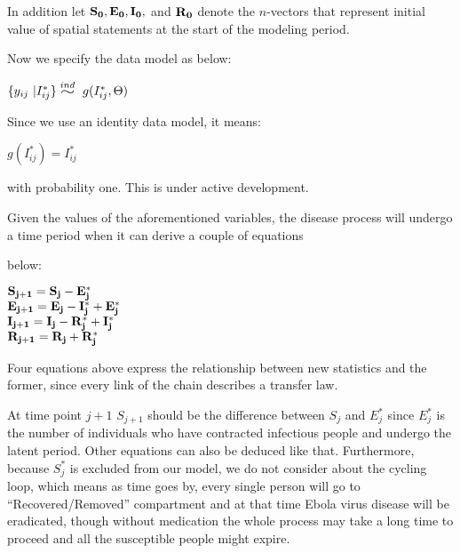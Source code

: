 \documentclass[12pt]{article}
\newcommand{\widesim}[2][1.5]{
      \mathrel{\overset{#2}{\scalebox{#1}[1]{$\sim$}}}
  }
\newcommand \mbreak {\\ \vspace{0.1in}}
\begin{document}
 In addition let ${\bf{S_0, E_0, I_0,}}$ and ${\bf{R_0}}$ denote the $n$-vectors that represent initial value of spatial statements at the start of the modeling period.
 
    Now we specify the data model as below: 

    \vspace{0.15in}

    \begin{center}
        ${ \{y_{ij}\ | I^*_{ij}\} \widesim{ind}\ g(I^*_{ij}, \Theta)  }$
    \end{center}

  Since we use an identity data model, it means: 
    \begin{center}
        $g(I^*_{ij}) = I^*_{ij}$  
    \end{center}
    with probability one. This is under active development. \\

    \vspace{0.15in}




    Given the values of the aforementioned variables, the disease process will undergo a time period when it can derive a couple of equations 

below: 
    \begin{center}
       { $\bf{S_{j+1}} = \bf{S_j} - \bf{E_j^*} $}\mbreak
       { $\bf{E_{j+1}} = \bf{E_j} - \bf{I_j^*} + \bf{E_j^*}$}\mbreak
       { $\bf{I_{j+1}} = \bf{I_j} - \bf{R_j^*} + \bf{I_j^*}$}\mbreak
       { $\bf{R_{j+1}} = \bf{R_j} + \bf{R_j^*} $}\mbreak
    \end{center}
    \vspace{0.15in}

   Four equations above express the relationship between new statistics and the former, since every link of the chain describes a transfer law. 

At time point ${j+1}$ ${S_{j+1}}$ should be the difference between ${S_j}$ and ${E_j^*}$ since ${E_j^*}$ is the number of individuals who have contracted infectious people and undergo the latent period. Other equations can also be deduced like that. Furthermore, because ${S_j^*}$ is excluded from our model, we do not consider about the cycling loop, which means as time goes by, every single person will go to ``Recovered/Removed'' compartment and at that time Ebola virus disease will be eradicated, though without medication the whole process may take a long time to proceed and all the susceptible people might expire.
\end{document}
